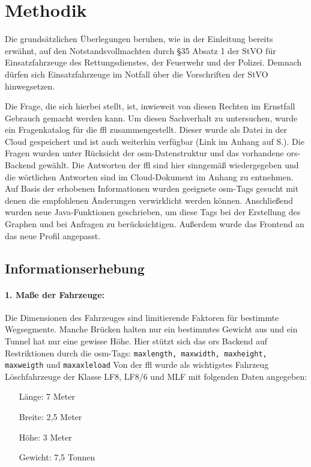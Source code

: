 \section{Methodik}
Die grundsätzlichen Überlegungen beruhen, wie in der Einleitung bereits erwähnt, auf den Notstandsvollmachten durch §35 Absatz 1 der StVO für Einsatzfahrzeuge des Rettungsdienstes, der Feuerwehr und der Polizei.
Demnach dürfen sich Einsatzfahrzeuge im Notfall über die Vorschriften der StVO hinwegsetzen.

Die Frage, die sich hierbei stellt, ist, inwieweit von diesen Rechten im Ernstfall Gebrauch gemacht werden kann.
Um diesen Sachverhalt zu untersuchen, wurde ein Fragenkatalog für die \gls{ffl} zusammengestellt.
Dieser wurde als Datei in der Cloud gespeichert und ist auch weiterhin verfügbar (Link im Anhang auf S.\pageref{sec:anhang}).
Die Fragen wurden unter Rücksicht der \gls{osm}-Datenstruktur und das vorhandene \gls{ors}-Backend gewählt.
Die Antworten der \gls{ffl} sind hier sinngemäß wiedergegeben und die wörtlichen Antworten sind im Cloud-Dokument im Anhang zu entnehmen.
Auf Basis der erhobenen Informationen wurden geeignete \gls{osm}-Tags gesucht mit denen die empfohlenen Änderungen verwirklicht werden können.
Anschließend wurden neue Java-Funktionen geschrieben, um diese Tags bei der Erstellung des Graphen und bei Anfragen zu berücksichtigen.
Außerdem wurde das Frontend an das neue Profil angepasst.

\subsection{Informationserhebung}

\paragraph*{1. Maße der Fahrzeuge:}
\label{frage1}
\par
Die Dimensionen des Fahrzeuges sind limitierende Faktoren für bestimmte Wegsegmente.
Manche Brücken halten nur ein bestimmtes Gewicht aus und ein Tunnel hat nur eine gewisse Höhe.
Hier stützt sich das \gls{ors} Backend auf Restriktionen durch die \gls{osm}-Tags: \texttt{maxlength, maxwidth, maxheight, maxweigth} und \texttt{maxaxleload} Von der \gls{ffl} wurde als wichtigstes Fahrzeug Löschfahrzeuge der Klasse LF8, LF8/6 und MLF mit folgenden Daten angegeben:
\begin{itemize}
\centering
\item[Länge:] 7 Meter
\item[Breite:] 2,5 Meter
\item[Höhe:] 3 Meter
\item[Gewicht:] 7,5 Tonnen
\end{itemize}

